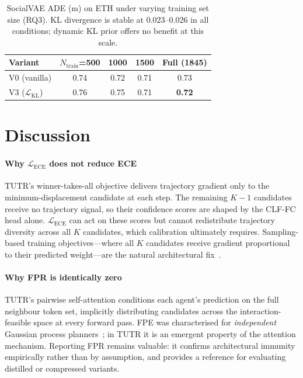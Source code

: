 \documentclass[journal]{IEEEtran}
\begin{document}

\begin{table}[t]
\caption{SocialVAE ADE (m) on ETH under varying training set size
  (RQ3). KL divergence is stable at $0.023$--$0.026$ in all
  conditions; dynamic KL prior offers no benefit at this scale.}
\label{tab:socialvae}
\centering
\setlength{\tabcolsep}{6pt}
\begin{tabular}{l c c c c}
\toprule
Variant & $N_\text{train}$=500 & 1000 & 1500 & Full (1845) \\
\midrule
V0 (vanilla) & 0.74 & 0.72 & 0.71 & 0.73 \\
V3 ($\mathcal{L}_\text{KL}$) & 0.76 & 0.75 & 0.71 & \textbf{0.72} \\
\bottomrule
\end{tabular}
\end{table}

\section{Discussion}
\label{sec:discussion}

\paragraph{Why $\mathcal{L}_{\text{ECE}}$ does not reduce ECE}
TUTR's winner-takes-all objective delivers trajectory gradient only to
the minimum-displacement candidate at each step.
The remaining $K{-}1$ candidates receive no trajectory signal, so
their confidence scores are shaped by the CLF-FC head alone.
$\mathcal{L}_{\text{ECE}}$ can act on these scores but cannot
redistribute trajectory diversity across all $K$ candidates, which
calibration ultimately requires.
Sampling-based training objectives---where all $K$ candidates receive
gradient proportional to their predicted weight---are the natural
architectural fix~\cite{karandikar2021soft}.

\paragraph{Why FPR is identically zero}
TUTR's pairwise self-attention conditions each agent's prediction on
the full neighbour token set, implicitly distributing candidates
across the interaction-feasible space at every forward pass.
FPE was characterised for \emph{independent} Gaussian process
planners~\cite{trautman2010unfreezing}; in TUTR it is an emergent
property of the attention mechanism.
Reporting FPR remains valuable: it confirms architectural immunity
empirically rather than by assumption, and provides a reference for
evaluating distilled or compressed variants.
\end{document}
